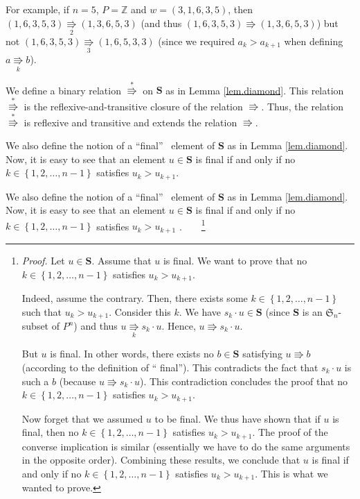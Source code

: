 \documentclass[numbers=enddot,12pt,final,onecolumn,notitlepage]{scrartcl}%
\theoremstyle{definition}
\newenvironment{verlong}{}{}
\newenvironment{vershort}{}{}
\begin{document}
For example, if $n=5$, $P=\mathbb{Z}$ and $w=\left(  3,1,6,3,5\right)  $, then
$\left(  1,6,3,5,3\right)  \underset{2}{\Rrightarrow}\left(  1,3,6,5,3\right)
$ (and thus $\left(  1,6,3,5,3\right)  \Rrightarrow\left(  1,3,6,5,3\right)
$) but not $\left(  1,6,3,5,3\right)  \underset{3}{\Rrightarrow}\left(
1,6,5,3,3\right)  $ (since we required $a_{k}>a_{k+1}$ when defining
$a\underset{k}{\Rrightarrow}b$).

We define a binary relation $\overset{\ast}{\Rrightarrow}$ on $\mathbf{S}$ as
in Lemma \ref{lem.diamond}. This relation $\overset{\ast}{\Rrightarrow}$ is
the reflexive-and-transitive closure of the relation $\Rrightarrow$. Thus, the
relation $\overset{\ast}{\Rrightarrow}$ is reflexive and transitive and
extends the relation $\Rrightarrow$.

\begin{vershort}
We also define the notion of a \textquotedblleft final\textquotedblright%
\ element of $\mathbf{S}$ as in Lemma \ref{lem.diamond}. Now, it is easy to
see that an element $u\in\mathbf{S}$ is final if and only if no $k\in\left\{
1,2,\ldots,n-1\right\}  $ satisfies $u_{k}>u_{k+1}$.
\end{vershort}

\begin{verlong}
We also define the notion of a \textquotedblleft final\textquotedblright%
\ element of $\mathbf{S}$ as in Lemma \ref{lem.diamond}. Now, it is easy to
see that an element $u\in\mathbf{S}$ is final if and only if no $k\in\left\{
1,2,\ldots,n-1\right\}  $ satisfies $u_{k}>u_{k+1}$%
.\ \ \ \ \footnote{\textit{Proof.} Let $u\in\mathbf{S}$. Assume that $u$ is
final. We want to prove that no $k\in\left\{  1,2,\ldots,n-1\right\}  $
satisfies $u_{k}>u_{k+1}$.
\par
Indeed, assume the contrary. Then, there exists some $k\in\left\{
1,2,\ldots,n-1\right\}  $ such that $u_{k}>u_{k+1}$. Consider this $k$. We
have $s_{k}\cdot u\in\mathbf{S}$ (since $\mathbf{S}$ is an $\mathfrak{S}_{n}%
$-subset of $P^{n}$) and thus $u\underset{k}{\Rrightarrow}s_{k}\cdot u$.
Hence, $u\Rrightarrow s_{k}\cdot u$.
\par
But $u$ is final. In other words, there exists no $b\in\mathbf{S}$ satisfying
$u\Rrightarrow b$ (according to the definition of \textquotedblleft
final\textquotedblright). This contradicts the fact that $s_{k}\cdot u$ is
such a $b$ (because $u\Rrightarrow s_{k}\cdot u$). This contradiction
concludes the proof that no $k\in\left\{  1,2,\ldots,n-1\right\}  $ satisfies
$u_{k}>u_{k+1}$.
\par
Now forget that we assumed $u$ to be final. We thus have shown that if $u$ is
final, then no $k\in\left\{  1,2,\ldots,n-1\right\}  $ satisfies
$u_{k}>u_{k+1}$. The proof of the converse implication is similar (essentially
we have to do the same arguments in the opposite order). Combining these
results, we conclude that $u$ is final if and only if no $k\in\left\{
1,2,\ldots,n-1\right\}  $ satisfies $u_{k}>u_{k+1}$. This is what we wanted to
prove.}
\end{verlong}
\end{document}
